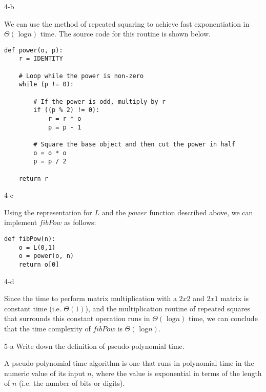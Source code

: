 \documentclass[11pt]{article}
\newcommand{\tlog}{\text{ log}}
\begin{document}
\begin{prob}{4-b}
\end{prob}
\begin{sol}

We can use the method of repeated squaring to achieve fast exponentiation in $\Theta(\tlog n)$ time. The source code for this routine is shown below.
\begin{lstlisting}
def power(o, p):
	r = IDENTITY
	
	# Loop while the power is non-zero
	while (p != 0):
		
		# If the power is odd, multiply by r 
		if ((p % 2) != 0):
			r = r * o
			p = p - 1
		
		# Square the base object and then cut the power in half 
		o = o * o
		p = p / 2

	return r
\end{lstlisting}
\end{sol}

\begin{prob}{4-c}
\end{prob}
\begin{sol}

Using the representation for $L$ and the $power$ function described above, we can implement $fibPow$ as follows:
\begin{lstlisting}
def fibPow(n):
	o = L(0,1)
	o = power(o, n)
	return o[0]
\end{lstlisting}
\end{sol}

\begin{prob}{4-d}
\end{prob}
\begin{sol}

Since the time to perform matrix multiplication with a $2x2$ and $2x1$ matrix is constant time (i.e. $\Theta(1)$), and the multiplication routine of repeated squares that surrounds this constant operation runs in $\Theta(\tlog n)$ time, we can conclude that the time complexity of $fibPow$ is $\Theta(\tlog n)$.
\end{sol}

\begin{prob}{5-a}
Write down the definition of pseudo-polynomial time.
\end{prob}
\begin{sol}
\begin{define}
A pseudo-polynomial time algorithm is one that runs in polynomial time in the numeric value of its input $n$, where the value is exponential in terms of the length of $n$ (i.e. the number of bits or digits).
\end{define}
\end{sol}
\end{document}
